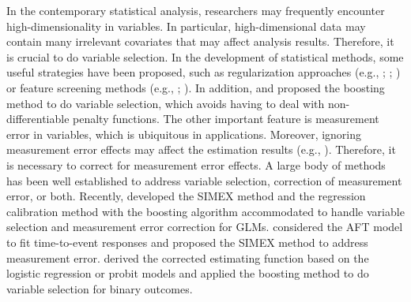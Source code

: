 In the contemporary statistical analysis, researchers may frequently encounter high-dimensionality in variables. In particular, {high-dimensional data} may contain many irrelevant covariates that {may} affect analysis results. Therefore, it is crucial to do variable selection. In the development of statistical methods, some useful strategies have been proposed, such as regularization approaches (e.g., \citealp{Tibshirani:1996}; \citealp{Zou:2006}; \citealp{Zou:2005}) or feature screening methods (e.g., \citealp{Chen:2021}; \citealp{Chen:2020}). In addition, \cite{Wolfson:2011} and \cite{Brown:2017} proposed the boosting method to do variable selection, which avoids {having to deal with} non-differentiable penalty functions. The other important feature is measurement error in variables, which is ubiquitous in applications. Moreover, ignoring measurement error effects may affect the estimation results (e.g., \citealp{ChenYi:2021}). Therefore, it is necessary to correct for measurement error effects. {A} large body of methods has been well established to address variable selection, correction of measurement error, or both. Recently, \cite{Chen:2023} developed the SIMEX method and the regression calibration method with the boosting algorithm accommodated to handle variable selection and measurement error correction for GLMs. \cite{ChenQiu:2023} considered the AFT model to fit time-to-event responses and proposed the SIMEX method to address measurement error. \cite{Chen:2023b} derived the corrected estimating function based on the logistic regression or probit models and applied the boosting method to do variable selection for binary outcomes.


